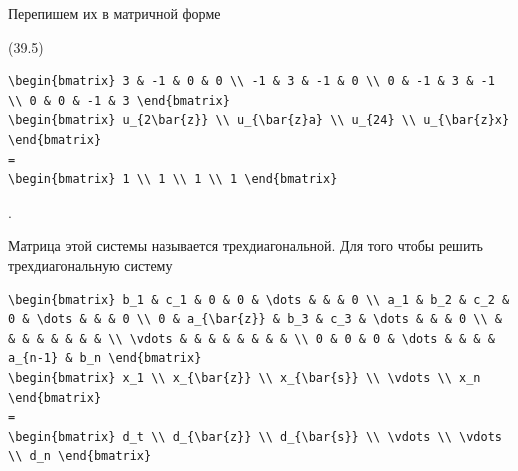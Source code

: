 \documentclass[
  ukrainian,
]{article}
\begin{document}
Перепишем их в матричной форме

(39.5)

\begin{verbatim}
\begin{bmatrix} 3 & -1 & 0 & 0 \\ -1 & 3 & -1 & 0 \\ 0 & -1 & 3 & -1 \\ 0 & 0 & -1 & 3 \end{bmatrix}
\begin{bmatrix} u_{2\bar{z}} \\ u_{\bar{z}a} \\ u_{24} \\ u_{\bar{z}x} \end{bmatrix}
=
\begin{bmatrix} 1 \\ 1 \\ 1 \\ 1 \end{bmatrix}
\end{verbatim}

.

Матрица этой системы называется трехдиагональной. Для того чтобы решить
трехдиагональную систему

\begin{verbatim}
\begin{bmatrix} b_1 & c_1 & 0 & 0 & \dots & & & 0 \\ a_1 & b_2 & c_2 & 0 & \dots & & & 0 \\ 0 & a_{\bar{z}} & b_3 & c_3 & \dots & & & 0 \\ & & & & & & & & \\ \vdots & & & & & & & & \\ 0 & 0 & 0 & \dots & & & & a_{n-1} & b_n \end{bmatrix}
\begin{bmatrix} x_1 \\ x_{\bar{z}} \\ x_{\bar{s}} \\ \vdots \\ x_n \end{bmatrix}
=
\begin{bmatrix} d_t \\ d_{\bar{z}} \\ d_{\bar{s}} \\ \vdots \\ \vdots \\ d_n \end{bmatrix}
\end{verbatim}
\end{document}
